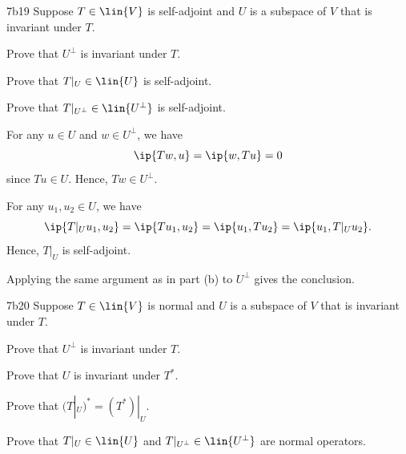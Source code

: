 \begin{exercise}{7b19}
    Suppose $T \in \lin{V}$ is self-adjoint and $U$ is a subspace of $V$ that is invariant under $T$.
    \begin{subexercises}
        \item Prove that $U^\perp$ is invariant under $T$.
        \item Prove that $T|_U \in \lin{U}$ is self-adjoint.
        \item Prove that $T|_{U^\perp} \in \lin{U^\perp}$ is self-adjoint.
    \end{subexercises}
\end{exercise}

\begin{solenum}
    \item For any $u \in U$ and $w \in U^\perp$, we have
    \[
        \ip{T w, u} = \ip{w, T u} = 0
    \]
    since $T u \in U$.
    Hence, $T w \in U^\perp$.
    \item For any $u_1, u_2 \in U$, we have
    \[
        \ip{T|_U u_1, u_2} = \ip{T u_1, u_2} = \ip{u_1, T u_2} = \ip{u_1, T|_U u_2}.
    \]
    Hence, $T|_U$ is self-adjoint.
    \item Applying the same argument as in part (b) to $U^\perp$ gives the conclusion.
\end{solenum}

\begin{exercise}{7b20}
    Suppose $T \in \lin{V}$ is normal and $U$ is a subspace of $V$ that is invariant under $T$.
    \begin{subexercises}
        \item Prove that $U^\perp$ is invariant under $T$.
        \item Prove that $U$ is invariant under $T^\ast$.
        \item Prove that $(T|_U)^\ast = (T^\ast)|_U$.
        \item Prove that $T|_U \in \lin{U}$ and $T|_{U^\perp} \in \lin{U^\perp}$ are normal operators.
    \end{subexercises}
    
\end{exercise}


